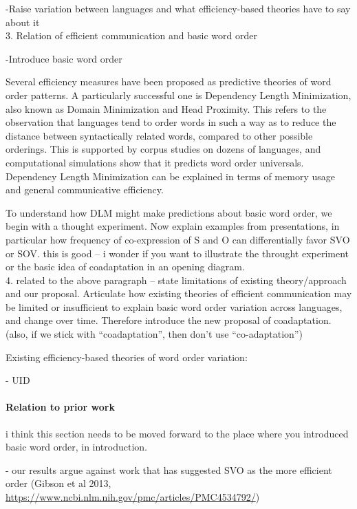 \documentclass[11pt,a4paper]{article}
\begin{document}
-Raise variation between languages and what efficiency-based theories have to say about it\\

{\color{blue}3. Relation of efficient communication and basic word order}

-Introduce basic word order

Several efficiency measures have been proposed as predictive theories of word order patterns.
A particularly successful one is Dependency Length Minimization, also known as Domain Minimization and Head Proximity.
This refers to the observation that languages tend to order words in such a way as to reduce the distance between syntactically related words, compared to other possible orderings.
This is supported by corpus studies on dozens of languages, and computational simulations show that it predicts word order universals.
Dependency Length Minimization can be explained in terms of memory usage and general communicative efficiency.

To understand how DLM might make predictions about basic word order, we begin with a thought experiment. Now explain examples from presentations, in particular how frequency of co-expression of S and O can differentially favor SVO or SOV. {\color{blue} this is good -- i wonder if you want to illustrate the throught experiment or the basic idea of coadaptation in an opening diagram.}\\


{\color{blue}4. related to the above paragraph -- state limitations of existing theory/approach and our proposal. Articulate how existing theories of efficient communication may be limited or insufficient to explain basic word order variation across languages, and change over time. Therefore introduce the new proposal of coadaptation. (also, if we stick with ``coadaptation'', then don't use ``co-adaptation'') }

Existing efficiency-based theories of word order variation:

- UID


\paragraph{Relation to prior work}

{\color{blue}i think this section needs to be moved forward to the place where you introduced basic word order, in introduction.}

- our results argue against work that has suggested SVO as the more efficient order (Gibson et al 2013, \url{https://www.ncbi.nlm.nih.gov/pmc/articles/PMC4534792/})
\end{document}

